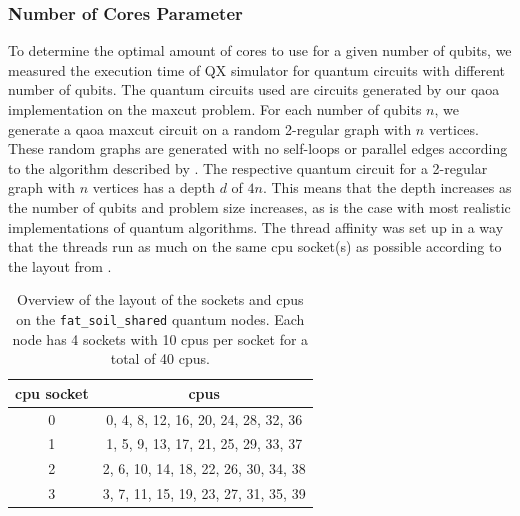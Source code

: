 \subsubsection{Number of Cores Parameter}
To determine the optimal amount of cores to use for a given number of qubits, we measured the execution time of QX simulator for quantum circuits with different number of qubits.
The quantum circuits used are circuits generated by our \gls{qaoa} implementation on the \gls{maxcut} problem.
For each number of qubits $n$, we generate a \gls{qaoa} \gls{maxcut} circuit on a random 2-regular graph with $n$ vertices.
These random graphs are generated with no self-loops or parallel edges according to the algorithm described by \textcite{steger1999generating}.
The respective quantum circuit for a 2-regular graph with $n$ vertices has a depth $d$ of $4n$.
This means that the depth increases as the number of qubits and problem size increases, as is the case with most realistic implementations of quantum algorithms.
The thread affinity was set up in a way that the threads run as much on the same \gls{cpu} socket(s) as possible according to the layout from .
\begin{table}[ht]
    \centering
    {\renewcommand{\arraystretch}{1.15}
        \begin{tabular}{c|c}
            \gls{cpu} socket & \glspl{cpu} \\
            \hline
            0 & 0, 4, 8, 12, 16, 20, 24, 28, 32, 36 \\
            1 & 1, 5, 9, 13, 17, 21, 25, 29, 33, 37 \\
            2 & 2, 6, 10, 14, 18, 22, 26, 30, 34, 38 \\
            3 & 3, 7, 11, 15, 19, 23, 27, 31, 35, 39 \\
        \end{tabular}
    }
    \caption[Overview of the layout of the sockets and \glspl{cpu} on the \texttt{fat_soil_shared} quantum nodes.]{
        Overview of the layout of the sockets and \glspl{cpu} on the \texttt{fat_soil_shared} quantum nodes.
        Each node has 4 sockets with 10 \glspl{cpu} per socket for a total of 40 \glspl{cpu}.
    }
    \label{table:fat-soil-affinities}
\end{table}

